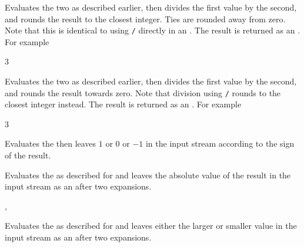 \documentclass[oneside]{book}
\begin{document}
\begin{function}{\IntMathDiv}
\begin{syntax}
  
\end{syntax}
Evaluates the two  as described earlier,
then divides the first value by the second, and rounds the result
to the closest integer. Ties are rounded away from zero. Note that
this is identical to using \verb|/| directly in an .
The result is returned as an .
For example
\begin{demohigh}
 {3}
\end{demohigh}
\end{function}

\begin{function}{\IntMathDivTrancate}
\begin{syntax}
  
\end{syntax}
Evaluates the two  as described earlier,
then divides the first value by the second, and rounds the result towards zero.
Note that division using \verb|/| rounds to the closest integer instead.
The result is returned as an .
For example
\begin{demohigh}
 {3}
\end{demohigh}
\end{function}

\begin{function}{\IntMathSign}
\begin{syntax}
 
\end{syntax}
Evaluates the  then leaves $1$ or $0$ or
$-1$ in the input stream according to the sign of the result.
\end{function}

\begin{function}{\IntMathAbs}
\begin{syntax}
 
\end{syntax}
Evaluates the  as described for
 and leaves the absolute value of the result in
the input stream as an  after two
expansions.
\end{function}

\begin{function}{\IntMathMax,\IntMathMin}
\begin{syntax}
  
  
\end{syntax}
Evaluates the  as described for
 and leaves either the larger or smaller value
in the input stream as an  after two
expansions.
\end{function}
\end{document}
